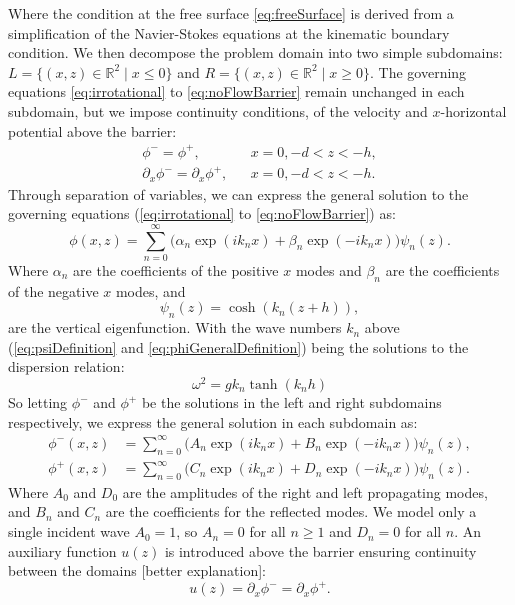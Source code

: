 \documentclass[a4paper,12pt]{report}
\begin{document}
Where the condition at the free surface \ref{eq:freeSurface} is derived from a simplification of the Navier-Stokes equations at the kinematic boundary condition. We then decompose the problem domain into two simple subdomains: $L = \{(x, z) \in \mathbb{R}^2 \mid x \leq 0\}$ and $R = \{(x, z) \in \mathbb{R}^2 \mid x \geq 0\}$. The governing equations \ref{eq:irrotational} to \ref{eq:noFlowBarrier} remain unchanged in each subdomain, but we impose continuity conditions, of the velocity and $x$-horizontal potential above the barrier:
\begin{align}
\label{eq:phiEquality}
\phi^- = \phi^+, &&  x=0, -d < z < -h,\\
\label{eq:phiPartialEquality}
\partial_x\phi^- = \partial_x\phi^+, &&  x=0, -d < z < -h.
\end{align}
Through separation of variables, we can express the general solution to the governing equations (\ref{eq:irrotational} to \ref{eq:noFlowBarrier}) as:
\begin{equation}
\label{eq:phiGeneralDefinition}
\phi(x,z) = \sum_{n=0}^{\infty} \big(\alpha_n\exp(ik_nx) + \beta_n\exp(-ik_nx)\big)\psi_n(z).
\end{equation}
Where $\alpha_n$ are the coefficients of the positive $x$ modes and $\beta_n$ are the coefficients of the negative $x$ modes, and 
\begin{equation}
\label{eq:psiDefinition}
    \psi_n(z) = \cosh(k_n(z+h)),
\end{equation} are the vertical eigenfunction. With the wave numbers $k_n$ above (\ref{eq:psiDefinition} and \ref{eq:phiGeneralDefinition}) being the solutions to the dispersion relation:
\begin{equation} 
\label{eq:waveNumbers}
\omega^2 = gk_n \tanh(k_nh)
\end{equation}
So letting $\phi^-$ and $\phi^+$ be the solutions in the left and right subdomains respectively, we express the general solution in each subdomain as:
\begin{align}
\label{eq:phiMinusDefinition}
\phi^-(x,z) &= \sum_{n=0}^{\infty} \big(A_n\exp(ik_nx) + B_n\exp(-ik_nx)\big)\psi_n(z),\\
\label{eq:phiPlusDefinition}
\phi^+(x,z) &= \sum_{n=0}^{\infty} \big(C_n\exp(ik_nx) + D_n\exp(-ik_nx)\big)\psi_n(z).
\end{align}
Where $A_0$ and $D_0$ are the amplitudes of the right and left propagating modes, and $B_n$ and $C_n$ are the coefficients for the reflected modes. We model only a single incident wave $A_0 = 1$, so $A_n = 0$ for all $n \geq 1$ and $D_n = 0$ for all $n$. An auxiliary function $u(z)$ is introduced above the barrier ensuring continuity between the domains [better explanation]: 
\begin{equation}
\label{eq:auxDefinition}
u(z) = \partial_x\phi^- = \partial_x\phi^+.
\end{equation}
\end{document}
